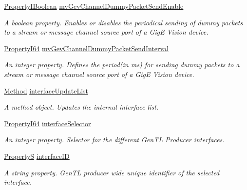 \begin{DoxyCompactItemize}
\hyperlink{group___common_interface_ga44f9437e24b21b6c93da9039ec6786aa}{Property\+I\+Boolean} \hyperlink{classmv_i_m_p_a_c_t_1_1acquire_1_1_gen_i_cam_1_1_system_module_a9881c83f6912bea00767ccbee5bc3385}{mv\+Gev\+Channel\+Dummy\+Packet\+Send\+Enable}
\begin{DoxyCompactList}\small\item\em A boolean property. Enables or disables the periodical sending of dummy packets to a stream or message channel source port of a Gig\+E Vision device. \end{DoxyCompactList}\item 
\hyperlink{group___common_interface_ga81749b2696755513663492664a18a893}{Property\+I64} \hyperlink{classmv_i_m_p_a_c_t_1_1acquire_1_1_gen_i_cam_1_1_system_module_aa62bfd581c2017182bbd1ad4173706d2}{mv\+Gev\+Channel\+Dummy\+Packet\+Send\+Interval}
\begin{DoxyCompactList}\small\item\em An integer property. Defines the period(in ms) for sending dummy packets to a stream or message channel source port of a Gig\+E Vision device. \end{DoxyCompactList}\item 
\hyperlink{classmv_i_m_p_a_c_t_1_1acquire_1_1_method}{Method} \hyperlink{classmv_i_m_p_a_c_t_1_1acquire_1_1_gen_i_cam_1_1_system_module_a9019b47e1561a33b050eae66a7a8372e}{interface\+Update\+List}
\begin{DoxyCompactList}\small\item\em A method object. Updates the internal interface list. \end{DoxyCompactList}\item 
\hyperlink{group___common_interface_ga81749b2696755513663492664a18a893}{Property\+I64} \hyperlink{classmv_i_m_p_a_c_t_1_1acquire_1_1_gen_i_cam_1_1_system_module_a48b00bc5a21e9f7839039da1f3555d47}{interface\+Selector}
\begin{DoxyCompactList}\small\item\em An integer property. Selector for the different Gen\+T\+L Producer interfaces. \end{DoxyCompactList}\item 
\hyperlink{classmv_i_m_p_a_c_t_1_1acquire_1_1_property_s}{Property\+S} \hyperlink{classmv_i_m_p_a_c_t_1_1acquire_1_1_gen_i_cam_1_1_system_module_a41763f2b261c03af6c0a8870e5d60a9f}{interface\+I\+D}
\begin{DoxyCompactList}\small\item\em A string property. Gen\+T\+L producer wide unique identifier of the selected interface. \end{DoxyCompactList}\item 

\end{DoxyCompactItemize}
